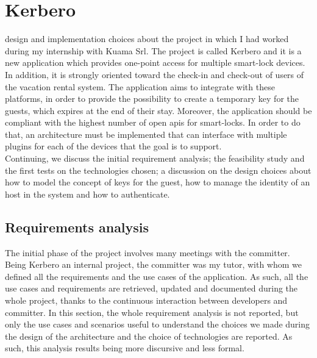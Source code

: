 
\chapter{Kerbero}
\label{cap:four}
 design and implementation choices about the project in which I had worked during my internship with Kuama Srl. The project is called Kerbero and it is a new application which provides one-point access for multiple smart-lock devices. In addition, it is strongly oriented toward the check-in and check-out of users of the vacation rental system. The application aims to integrate with these platforms, in order to provide the possibility to create a temporary key for the guests, which expires at the end of their stay. Moreover, the application should be compliant with the highest number of open \acrshort{api}s for smart-locks. In order to do that, an architecture must be implemented that can interface with multiple plugins for each of the devices that the goal is to support.
\\ Continuing, we discuss the initial requirement analysis; the feasibility study and the first tests on the technologies chosen; a discussion on the design choices about how to model the concept of keys for the guest, how to manage the identity of an host in the system and how to authenticate.

\section{Requirements analysis}
The initial phase of the project involves many meetings with the committer. Being Kerbero an internal project, the committer was my tutor, with whom we defined all the requirements and the use cases of the application. As such, all the use cases and requirements are retrieved, updated and documented during the whole project, thanks to the continuous interaction between developers and committer. 
In this section, the whole requirement analysis is not reported, but only the use cases and scenarios useful to understand the choices we made during the design of the architecture and the choice of technologies are reported. As such, this analysis results being more discursive and less formal.

